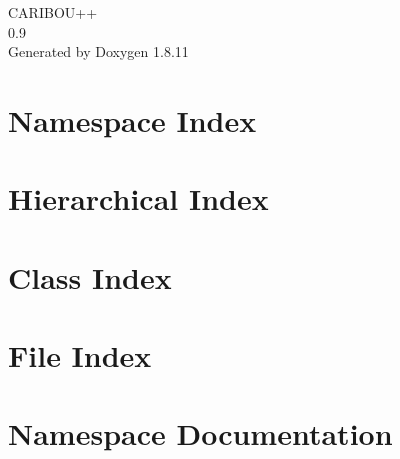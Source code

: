 \documentclass[twoside]{book}
\newcommand{\+}{\discretionary{\mbox{\scriptsize$\hookleftarrow$}}{}{}}
\newcommand{\clearemptydoublepage}{%
  \newpage{\pagestyle{empty}\cleardoublepage}%
}
\begin{document}
\begin{titlepage}
\vspace*{7cm}
\begin{center}%
{\Large C\+A\+R\+I\+B\+O\+U++ \\[1ex]\large 0.\+9 }\\
\vspace*{1cm}
{\large Generated by Doxygen 1.8.11}\\
\end{center}
\end{titlepage}
\clearemptydoublepage
\tableofcontents
\clearemptydoublepage
{}

\chapter{Namespace Index}

\chapter{Hierarchical Index}

\chapter{Class Index}

\chapter{File Index}

\chapter{Namespace Documentation}

\end{document}
